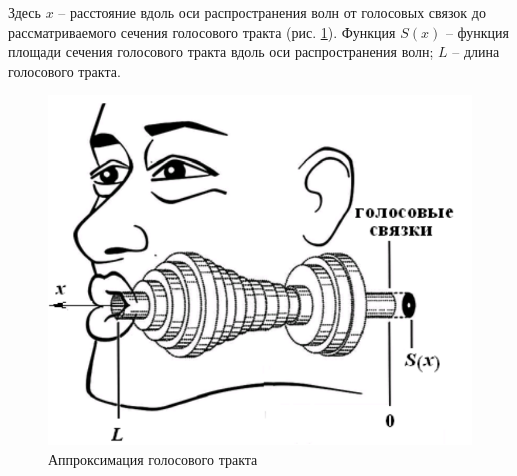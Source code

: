 		Здесь $x$ -- расстояние вдоль оси распространения волн от голосовых связок до рассматриваемого сечения голосового тракта (рис. \ref{VOICE}). Функция $S(x)$ -- функция площади сечения голосового тракта вдоль оси распространения волн; $L$ -- длина голосового тракта.
		
		\begin{figure}[h!]
			\centering
			\includegraphics[width=0.9\linewidth]{Pictures/Voice.png}
			\caption{Аппроксимация голосового тракта}
			\label{VOICE}
		\end{figure}
		
